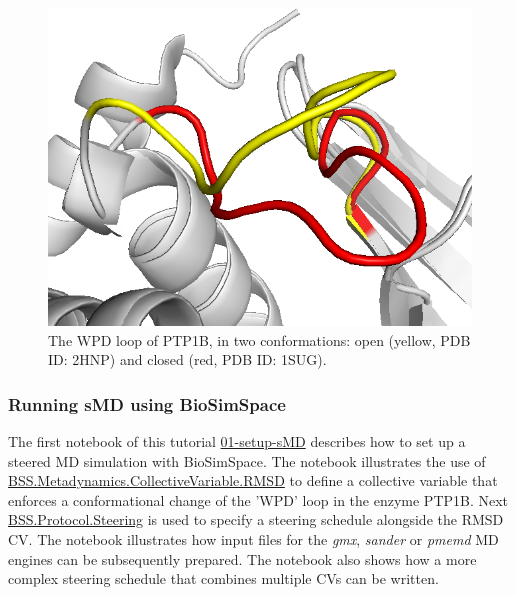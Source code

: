 \begin{figure}[htp]
\includegraphics[width=\linewidth]{LIVECOMS/03_steered_md/open-close.png}
\caption{The WPD loop of PTP1B, in two conformations: open (yellow, PDB ID: 2HNP) and closed (red, PDB ID: 1SUG).}
\label{fig:ptp1b}
\end{figure}

\subsubsection{Running sMD using BioSimSpace}

The first notebook of this tutorial \href{https://github.com/OpenBioSim/biosimspace_tutorials/blob/main/03_steered_md/01_setup_sMD.ipynb}{01-setup-sMD} describes how to set up a steered MD simulation with BioSimSpace. 
The notebook illustrates the use of \href{https://biosimspace.openbiosim.org/api/generated/BioSimSpace.Metadynamics.CollectiveVariable.RMSD.html#BioSimSpace.Metadynamics.CollectiveVariable.RMSD}{BSS.Metadynamics.CollectiveVariable.RMSD} to define a collective variable that enforces a conformational change of the 'WPD' loop in the enzyme PTP1B. 
Next \href{https://biosimspace.openbiosim.org/api/generated/BioSimSpace.Protocol.Steering.html#BioSimSpace.Protocol.Steering}{BSS.Protocol.Steering} is used to specify a steering schedule alongside the RMSD CV. The notebook illustrates how input files for the \emph{gmx}, \emph{sander} or \emph{pmemd} MD engines can be subsequently prepared. The notebook also shows how a more complex steering schedule that combines multiple CVs can be written. 

